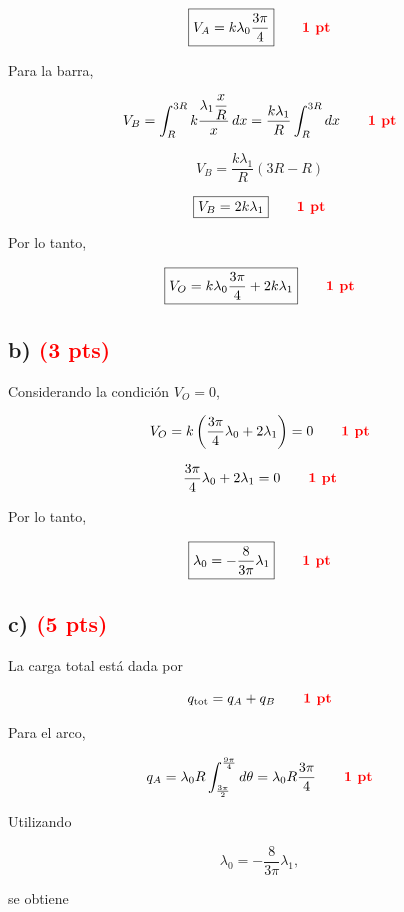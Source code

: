 \documentclass[12pt]{article}
\begin{document}
\[
\boxed{
V_A
=
k\lambda_0\frac{3\pi}{4}
}
\qquad
\textcolor{red}{\textbf{1 pt}}
\]

Para la barra,

\[
V_B
=
\int_R^{3R}
k\frac{\lambda_1\dfrac{x}{R}}{x}\,dx
=
\frac{k\lambda_1}{R}
\int_R^{3R}dx
\qquad
\textcolor{red}{\textbf{1 pt}}
\]

\[
V_B
=
\frac{k\lambda_1}{R}(3R-R)
\]

\[
\boxed{
V_B=2k\lambda_1
}
\qquad
\textcolor{red}{\textbf{1 pt}}
\]

Por lo tanto,

\[
\boxed{
V_O
=
k\lambda_0\frac{3\pi}{4}
+
2k\lambda_1
}
\qquad
\textcolor{red}{\textbf{1 pt}}
\]


\subsection*{b) \hfill \textcolor{red}{\textbf{(3 pts)}}}

Considerando la condición $V_O=0$,

\[
V_O
=
k\left(
\frac{3\pi}{4}\lambda_0+2\lambda_1
\right)
=
0
\qquad
\textcolor{red}{\textbf{1 pt}}
\]

\[
\frac{3\pi}{4}\lambda_0+2\lambda_1=0
\qquad
\textcolor{red}{\textbf{1 pt}}
\]

Por lo tanto,

\[
\boxed{
\lambda_0
=
-\frac{8}{3\pi}\lambda_1
}
\qquad
\textcolor{red}{\textbf{1 pt}}
\]


\subsection*{c) \hfill \textcolor{red}{\textbf{(5 pts)}}}

La carga total está dada por

\[
q_{\text{tot}}
=
q_A+q_B
\qquad
\textcolor{red}{\textbf{1 pt}}
\]

Para el arco,

\[
q_A
=
\lambda_0R
\int_{\frac{3\pi}{2}}^{\frac{9\pi}{4}}d\theta
=
\lambda_0R\frac{3\pi}{4}
\qquad
\textcolor{red}{\textbf{1 pt}}
\]

Utilizando

\[
\lambda_0
=
-\frac{8}{3\pi}\lambda_1,
\]

se obtiene
\end{document}
